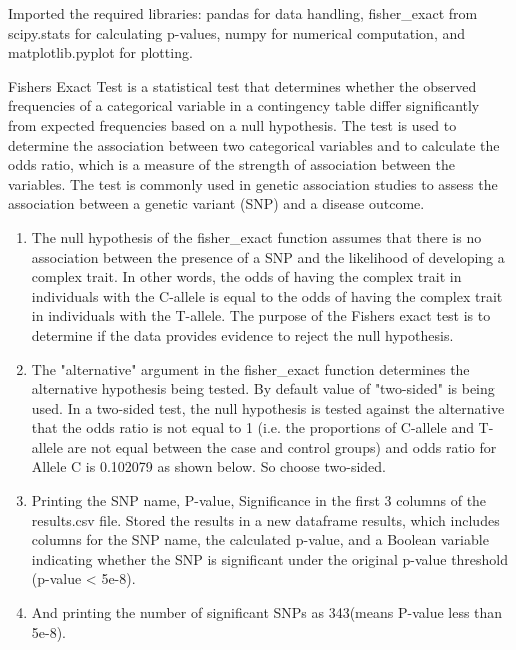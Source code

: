 \documentclass[
]{article}
\begin{document}
Imported the required libraries: pandas for data handling, fisher\_exact
from scipy.stats for calculating p-values, numpy for numerical
computation, and matplotlib.pyplot for plotting.

Fisher\textquotesingle s Exact Test is a statistical test that
determines whether the observed frequencies of a categorical variable in
a contingency table differ significantly from expected frequencies based
on a null hypothesis. The test is used to determine the association
between two categorical variables and to calculate the odds ratio, which
is a measure of the strength of association between the variables. The
test is commonly used in genetic association studies to assess the
association between a genetic variant (SNP) and a disease outcome.

\begin{enumerate}
\def\labelenumi{\alph{enumi})}
\item
  The null hypothesis of the fisher\_exact function assumes that there
  is no association between the presence of a SNP and the likelihood of
  developing a complex trait. In other words, the odds of having the
  complex trait in individuals with the C-allele is equal to the odds of
  having the complex trait in individuals with the T-allele. The purpose
  of the Fisher\textquotesingle s exact test is to determine if the data
  provides evidence to reject the null hypothesis. 
\item
  The "alternative" argument in the fisher\_exact function determines
  the alternative hypothesis being tested. By default value of
  "two-sided" is being used. In a two-sided test, the null hypothesis is
  tested against the alternative that the odds ratio is not equal to 1
  (i.e. the proportions of C-allele and T-allele are not equal between
  the case and control groups) and odds ratio for Allele C is 0.102079 as shown below. So choose two-sided.
\item

  Printing the SNP name, P-value, Significance in the first 3 columns of
  the results.csv file. Stored the results in a new dataframe results,
  which includes columns for the SNP name, the calculated p-value, and a
  Boolean variable indicating whether the SNP is significant under the
  original p-value threshold (p-value \textless{} 5e-8).
\item
  And printing the number of significant SNPs as 343(means P-value less
  than 5e-8).
\end{enumerate}
\end{document}
